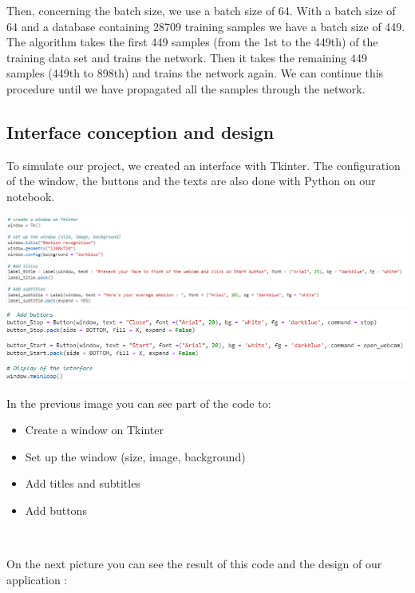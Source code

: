 \documentclass[a4paper, 10pt, conference]{ieeeconf}      %
\begin{document}
Then, concerning the batch size, we use a batch size of 64.
With a batch size of 64 and a database containing 28709 training samples we have a batch size of 449.
The algorithm takes the first 449 samples (from the 1st to the 449th) of the training data set and trains the network.
Then it takes the remaining 449 samples (449th to 898th) and trains the network again.
We can continue this procedure until we have propagated all the samples through the network.

\subsection{Interface conception and design}
To simulate our project, we created an interface with Tkinter.
The configuration of the window, the buttons and the texts are also done with Python on our notebook.

\begin{center}
\includegraphics[scale=0.3]{Model1}\\
\includegraphics[scale=0.4]{Model2}
\label{fig3}
\end{center}

In the previous image you can see part of the code to:
\begin{itemize}
\item Create a window on Tkinter
\item Set up the window (size, image, background)
\item Add titles and subtitles
\item Add buttons
\end{itemize}\

On the next picture you can see the result of this code and the design of our application :
\end{document}
